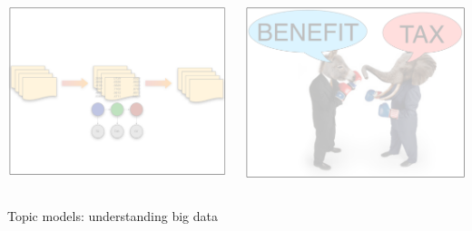 \documentclass[xcolor=dvipsnames]{beamer}
\begin{document}
{\begin{frame}[plain]
  \begin{columns}
    \begin{center}
      \includegraphics[width=\linewidth]{cognitive/algorithms_off}
      \end{center}
    \begin{center}
      \includegraphics[width=\linewidth]{cognitive/framing_off}
      \end{center}
  \end{columns}

  \vspace{-4cm}

        \begin{block}{Topic models: understanding big data}


\end{block}
\end{frame}}
\end{document}
